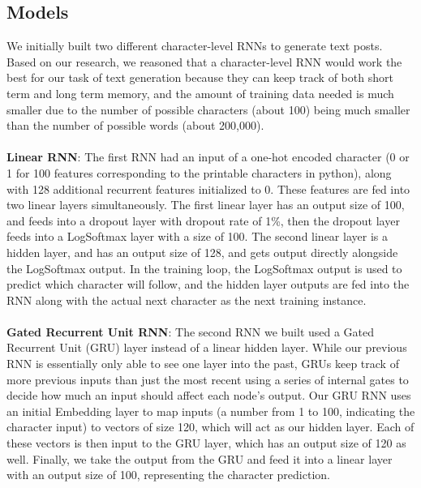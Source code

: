 \documentclass{article}
\begin{document}
\subsection{Models}
We initially built two different character-level RNNs to generate text posts. Based on our research, we reasoned that a character-level RNN would work the best for our task of text generation because they can keep track of both short term and long term memory, and the amount of training data needed is much smaller due to the number of possible characters (about 100) being much smaller than the number of possible words (about 200,000). \\ \\ 
\textbf{Linear RNN}: The first RNN had an input of a one-hot encoded character (0 or 1 for 100 features corresponding to the printable characters in python), along with 128 additional recurrent features initialized to 0. These features are fed into two linear layers simultaneously. The first linear layer has an output size of 100, and feeds into a dropout layer with dropout rate of 1\%, then the dropout layer feeds into a LogSoftmax layer with a size of 100. The second linear layer is a hidden layer, and has an output size of 128, and gets output directly alongside the LogSoftmax output. In the training loop, the LogSoftmax output is used to predict which character will follow, and the hidden layer outputs are fed into the RNN along with the actual next character as the next training instance. \\ \\
\textbf{Gated Recurrent Unit RNN}: The second RNN we built used a Gated Recurrent Unit (GRU) layer instead of a linear hidden layer. While our previous RNN is essentially only able to see one layer into the past, GRUs keep track of more previous inputs than just the most recent using a series of internal gates to decide how much an input should affect each node's output. Our GRU RNN uses an initial Embedding layer to map inputs (a number from 1 to 100, indicating the character input) to vectors of size 120, which will act as our hidden layer. Each of these vectors is then input to the GRU layer, which has an output size of 120 as well. Finally, we take the output from the GRU and feed it into a linear layer with an output size of 100, representing the character prediction.
\end{document}
